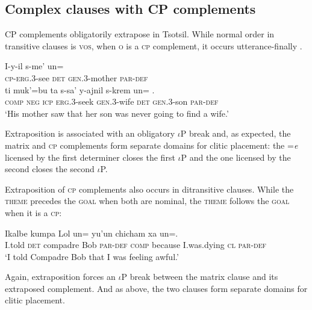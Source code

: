 \documentclass[output=paper,
modfonts
]{LSP/langsci}
\begin{document}
\subsection{Complex clauses with CP complements}
CP complements obligatorily extrapose in Tsotsil. While normal order in transitive clauses is \textsc{vos},
 when \textsc{o} is a \textsc{cp} complement, it occurs utterance-finally \citep{aissen1992}.
 \begin{exe}
\ex\label{exe:zzz}\bridgeoverex
\gll I-y-il   s-me' un=  \textbardbl \\
\textsc{cp-erg.3}-see  \textsc{det} \textsc{gen.3}-mother  \textsc{par-def} {} \\
\glt {}
\gll ti muk'=bu ta s-sa' y-ajnil  s-krem un= . \\
\textsc{comp} \textsc{neg} \textsc{icp} \textsc{erg.3}-seek \textsc{gen.3}-wife  \textsc{det}  \textsc{gen.3}-son \textsc{par-def} \\ 
\glt `His mother saw that her son was never going to find a wife.'   \citep[55]{laughlin1977}
\end{exe}
Extraposition is associated with an obligatory $\iota$P break and, as expected, the matrix and \textsc{cp} complements form separate domains for clitic placement: the =\emph{e} licensed by the first determiner closes the first $\iota$P and the one licensed by the second
closes the second  $\iota$P. 

Extraposition of \textsc{cp} complements also occurs in ditransitive clauses. While the \textsc{theme} precedes the \textsc{goal} when both are nominal,
the \textsc{theme} follows the \textsc{goal} when it is a \textsc{cp}: 
\begin{exe}
\ex\label{exe:zzz2}\bridgeoverex
\gll Ikalbe  kumpa Lol un=  \textbardbl {}  yu'un chicham xa un=. \\
I.told  \textsc{det} compadre Bob \textsc{par-def} {} \textsc{comp} because I.was.dying \textsc{cl} \textsc{par-def} \\ 
\glt \vspace*{-6ex}`I told Compadre Bob that I was feeling awful.' \citep[30]{laughlin1980}
\end{exe}
Again, extraposition forces an $\iota$P break between the matrix clause and its extraposed complement. 
And as above, the two clauses form separate domains for clitic placement. 
 
\end{document}
